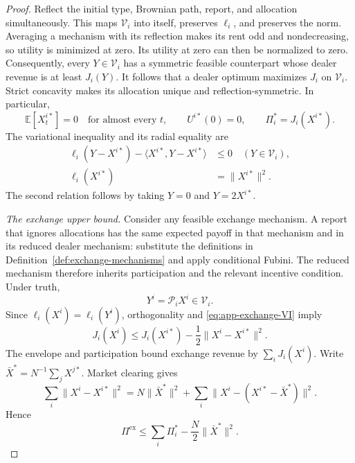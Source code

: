 \documentclass[12pt]{article}
\newcommand{\E}{\mathbb{E}}
\begin{document}
\begin{proof}
Reflect the initial type, Brownian path, report, and allocation
simultaneously. This maps \(\mathcal V_i\) into itself, preserves
\(\ell_i\), and preserves the norm. Averaging a mechanism with its
reflection makes its rent odd and nondecreasing, so utility is
minimized at zero. Its utility at zero can then be normalized to zero.
Consequently, every \(Y\in\mathcal V_i\) has a symmetric feasible
counterpart whose dealer revenue is at least \(J_i(Y)\).
It follows that a dealer optimum maximizes \(J_i\) on
\(\mathcal V_i\). Strict concavity makes its allocation unique and
reflection-symmetric. In particular,
\begin{equation}\label{eq:app-exchange-mean-zero}
  \E[X_t^{i\ast}]=0\quad\text{for almost every }t,
  \qquad
  U^{i\ast}(0)=0,
  \qquad
  \Pi_i^\ast=J_i(X^{i\ast}).
\end{equation}
The variational inequality and its radial equality are
\begin{equation}\label{eq:app-exchange-VI}
\begin{split}
  \ell_i(Y-X^{i\ast})
    -\langle X^{i\ast},Y-X^{i\ast}\rangle&\leq0
       \quad(Y\in\mathcal V_i),\\
  \ell_i(X^{i\ast})&=\|X^{i\ast}\|^2 .
\end{split}
\end{equation}
The second relation follows by taking \(Y=0\) and \(Y=2X^{i\ast}\).

\emph{The exchange upper bound.}
Consider any feasible exchange mechanism. A report that ignores
allocations has the same expected payoff in that mechanism and in its
reduced dealer mechanism: substitute the definitions in
Definition~\ref{def:exchange-mechanisms} and apply conditional Fubini.
The reduced mechanism therefore inherits participation and the relevant
incentive condition. Under truth,
\[
  Y^i=\mathcal P_iX^i\in\mathcal V_i .
\]
Since \(\ell_i(X^i)=\ell_i(Y^i)\), orthogonality and
\eqref{eq:app-exchange-VI} imply
\[
  J_i(X^i)\leq
  J_i(X^{i\ast})-\frac12\|X^i-X^{i\ast}\|^2.
\]
The envelope and participation bound exchange revenue by
\(\sum_iJ_i(X^i)\). Write
\(\bar X^\ast=N^{-1}\sum_jX^{j\ast}\). Market clearing gives
\[
  \sum_i\|X^i-X^{i\ast}\|^2
  =
  N\|\bar X^\ast\|^2+
  \sum_i\|X^i-(X^{i\ast}-\bar X^\ast)\|^2 .
\]
Hence
\begin{equation}\label{eq:app-exchange-upper-bound}
  \Pi^{\mathrm{ex}}\leq
    \sum_i\Pi_i^\ast-\frac N2\|\bar X^\ast\|^2 .
\end{equation}


\end{proof}
\end{document}
